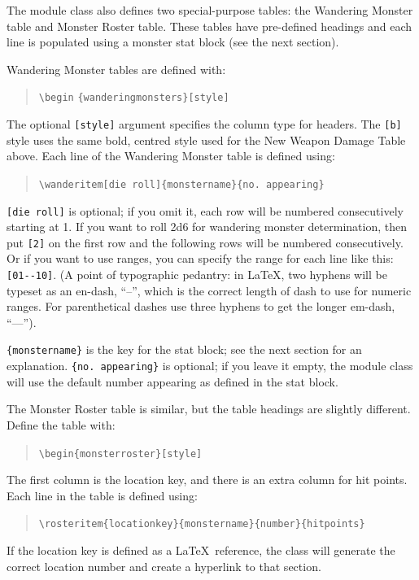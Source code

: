 \documentclass[letterpaper,serif]{module}
\begin{document}
\vspace{1em}\noindent The module class also defines two special-purpose tables: the Wandering Monster table and Monster Roster table. These tables
have pre-defined headings and each line is populated using a monster stat block (see the next section).

Wandering Monster tables are defined with:
\begin{quote}
\verb|\begin| \verb|{wanderingmonsters}[style]|
\end{quote}
The optional \verb|[style]| argument specifies the column type for headers. The \verb|[b]| style uses the same bold,
centred style used for the New Weapon Damage Table above. Each line of the Wandering Monster table is defined using:
\begin{quote}
\verb|\wanderitem[die roll]{monstername}{no. appearing}|
\end{quote}
\verb|[die roll]| is optional; if you omit it, each row will be numbered consecutively starting at 1. If you want to
roll 2d6 for wandering monster determination, then put \verb|[2]| on the first row and the following rows will be numbered
consecutively. Or if you want to use ranges, you can specify the range for each line like this: \verb|[01--10]|.
(A point of typographic pedantry: in \LaTeX, two hyphens will be typeset as an en-dash, ``--'', which is the correct length
of dash to use for numeric ranges. For parenthetical dashes use three hyphens to get the longer em-dash, ``---'').

\verb|{monstername}| is the key for the stat block; see the next section for an explanation.
\verb|{no. appearing}| is optional; if you leave it empty, the module class will use the default number appearing as defined in the stat block.

The Monster Roster table is similar, but the table headings are slightly different. Define the table with:
\begin{quote}
\verb|\begin{monsterroster}[style]|
\end{quote}
The first column is the location key, and there is an extra column for hit points. Each line in
the table is defined using:
\begin{quote}
\hspace{-2em}\verb|\rosteritem{locationkey}{monstername}{number}{hitpoints}|
\end{quote}
If the location key is defined as a \LaTeX~reference, the class will generate the correct location number and create a hyperlink to that section.
\end{document}
